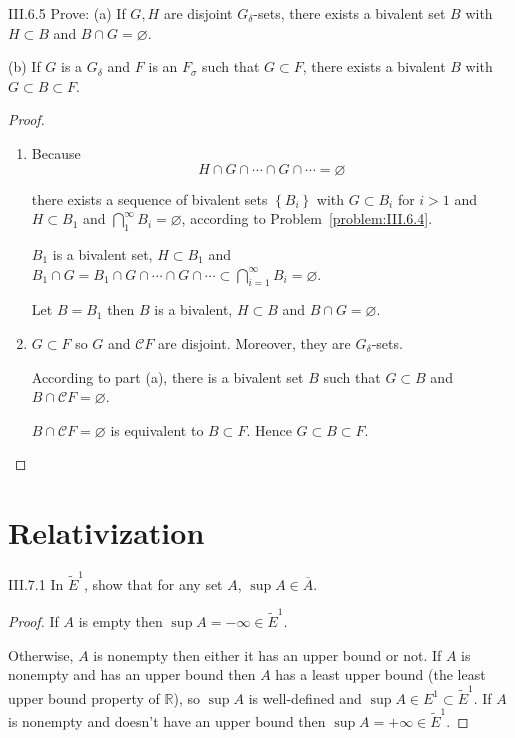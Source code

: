 \begin{problem}{III.6.5}
Prove: (a) If \(G, H\) are disjoint \(G_{\delta}\)-sets, there exists a bivalent set \(B\) with \(H \subset B\) and \( B \cap G = \varnothing \).

(b) If \(G\) is a \(G_{\delta}\) and \(F\) is an \(F_{\sigma}\) such that \(G \subset F\), there exists a bivalent \(B\) with \( G \subset B \subset F \).
\end{problem}

\begin{proof}
	\begin{enumerate}[label={(\alph*)}]
		\item Because
		      \[
			      H \cap G \cap \cdots \cap G \cap \cdots = \varnothing
		      \]

		      there exists a sequence of bivalent sets \( \left\{ B_{i} \right\} \) with \(G \subset B_{i}\) for \(i>1\) and \(H \subset B_{1}\) and \( \bigcap^{\infty}_{1} B_{i} = \varnothing \), according to Problem~\ref{problem:III.6.4}.

		      \(B_{1}\) is a bivalent set, \( H \subset B_{1} \) and \( B_{1} \cap G = B_{1} \cap G \cap \cdots \cap G \cap \cdots \subset \bigcap^{\infty}_{i=1} B_{i} = \varnothing \).

		      Let \( B = B_{1} \) then \(B\) is a bivalent, \( H \subset B \) and \( B \cap G = \varnothing \).
		\item \( G \subset F \) so \( G \) and \( \mathscr{C}F \) are disjoint. Moreover, they are \( G_{\delta} \)-sets.

		      According to part (a), there is a bivalent set \(B\) such that \( G \subset B \) and \( B \cap \mathscr{C}F = \varnothing \).

		      \( B \cap \mathscr{C}F = \varnothing \) is equivalent to \( B \subset F \). Hence \( G \subset B \subset F \).
	\end{enumerate}
\end{proof}

\section{Relativization}

\begin{problem}{III.7.1}
In \( {\tilde{E}}^{1} \), show that for any set \(A\), \(\sup A \in \overline{A}\).
\end{problem}

\begin{proof}
	If \( A \) is empty then \( \sup A = -\infty \in \tilde{E}^{1} \).

	Otherwise, \( A \) is nonempty then either it has an upper bound or not. If \(A\) is nonempty and has an upper bound then \(A\) has a least upper bound (the least upper bound property of \(\mathbb{R}\)), so \( \sup A \) is well-defined and \( \sup A \in E^{1} \subset \tilde{E}^{1} \). If \( A \) is nonempty and doesn't have an upper bound then \( \sup A = +\infty \in \tilde{E}^{1} \).
\end{proof}

